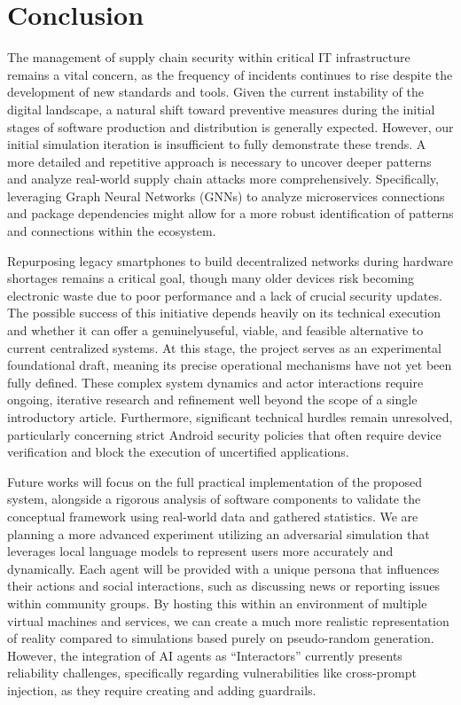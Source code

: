 \chapter*{Conclusion}
\label{chap:conclusion}
\setlength{\parskip}{1em}

The management of supply chain security within critical IT infrastructure remains a vital concern, as the frequency of incidents continues to rise despite the development of new standards and tools. Given the current instability of the digital landscape, a natural shift toward preventive measures during the initial stages of software production and distribution is generally expected. However, our initial simulation iteration is insufficient to fully demonstrate these trends. A more detailed and repetitive approach is necessary to uncover deeper patterns and analyze real-world supply chain attacks more comprehensively. Specifically, leveraging Graph Neural Networks (GNNs) to analyze microservices connections and package dependencies might allow for a more robust identification of patterns and connections within the ecosystem.

Repurposing legacy smartphones to build decentralized networks during hardware shortages remains a critical goal, though many older devices risk becoming electronic waste due to poor performance and a lack of crucial security updates. The possible success of this initiative depends heavily on its technical execution and whether it can offer a genuinelyuseful, viable, and feasible alternative to current centralized systems. At this stage, the project serves as an experimental foundational draft, meaning its precise operational mechanisms have not yet been fully defined. These complex system dynamics and actor interactions require ongoing, iterative research and refinement well beyond the scope of a single introductory article. Furthermore, significant technical hurdles remain unresolved, particularly concerning strict Android security policies that often require device verification and block the execution of uncertified applications.

Future works will focus on the full practical implementation of the proposed system, alongside a rigorous analysis of software components to validate the conceptual framework using real-world data and gathered statistics. We are planning a more advanced experiment utilizing an adversarial simulation that leverages local language models to represent users more accurately and dynamically. Each agent will be provided with a unique persona that influences their actions and social interactions, such as discussing news or reporting issues within community groups. By hosting this within an environment of multiple virtual machines and services, we can create a much more realistic representation of reality compared to simulations based purely on pseudo-random generation. However, the integration of AI agents as “Interactors” currently presents reliability challenges, specifically regarding vulnerabilities like cross-prompt injection, as they require creating and adding guardrails.

